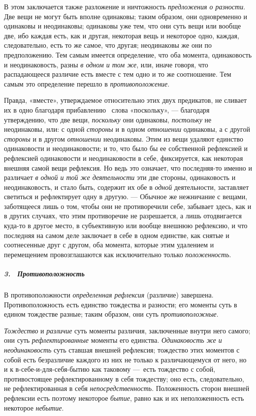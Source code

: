 В этом заключается также разложение и ничтожность{\em 
предложения о разности}. Две вещи не могут быть вполне одинаковы; таким
образом, они одновременно и одинаковы и неодинаковы; одинаковы уже тем, что
они суть вещи или вообще две, ибо каждая есть, как и другая, некоторая вещь
и некоторое одно, каждая, следовательно, есть то же самое, что другая;
неодинаковы же они по предположению. Тем самым имеется определение, что оба
момента, одинаковость и неодинаковость, разны {\em в
одном и том же}, или, иначе говоря, что распадающееся различие есть вместе
с тем одно и то же соотношение. Тем самым это определение перешло в
{\em противоположение}.

Правда, «вместе», утверждаемое относительно этих двух предикатов, не сливает
их в одно благодаря прибавлению \ слова «поскольку», — благодаря
утверждению, что две вещи, {\em поскольку} они
одинаковы, {\em постольку} не неодинаковы, или: с одной
{\em стороны} и в одном
{\em отношении} одинаковы, а с другой
{\em стороны} и в другом
{\em отношении} неодинаковы. Этим из вещи удаляют
единство одинаковости и неодинаковости; и то, что было бы ее собственной
рефлексией и рефлексией одинаковости и неодинаковости в себе, фиксируется,
как некоторая внешняя самой вещи рефлексия. Но ведь это означает, что
последняя-то именно и различает {\em в одной и той же
деятельности} эти две стороны, одинаковость и неодинаковость, и стало быть,
содержит их обе в {\em одной} деятельности, заставляет
светиться и рефлектирует одну в другую. — Обычное же нежничание с вещами,
заботящееся лишь о том, чтобы они не противоречили себе, забывает здесь,
как и в других случаях, что этим противоречие не разрешается, а лишь
отодвигается куда-то в другое место, в субъективную или вообще внешнюю
рефлексию, и что последняя на самом деле заключает в себе в одном единстве,
как снятые и соотнесенные друг с другом, оба момента, которые этим
удалением и перемещением провозглашаются как исключительно только
{\em положенность}.

\subparagraph[3. \ Противоположность]{3. \ Противоположность}
В противоположности {\em определенная рефлексия} (различие) завершена.
Противоположность есть единство тождества и разности; его моменты суть в
едином тождестве разные; таким образом, они суть
{\em противоположные}.

{\em Тождество} и {\em различие}
суть моменты различия, заключенные внутри него самого; они суть
{\em рефлектированные} моменты его единства.
{\em Одинаковость же и неодинаковость} суть ставшая
внешней рефлексия; тождество этих моментов с собой есть безразличие каждого
из них не только к различающемуся от него, но и к в-себе-и-для-себя-бытию
как таковому —~есть тождество с собой, противостоящее рефлектированному в
себя тождеству; оно есть, следовательно, не рефлектированная в себя
{\em непосредственность}. Положенность сторон внешней
рефлексии есть поэтому некоторое {\em бытие}, равно как
и их неположенность есть некоторое {\em небытие}.

